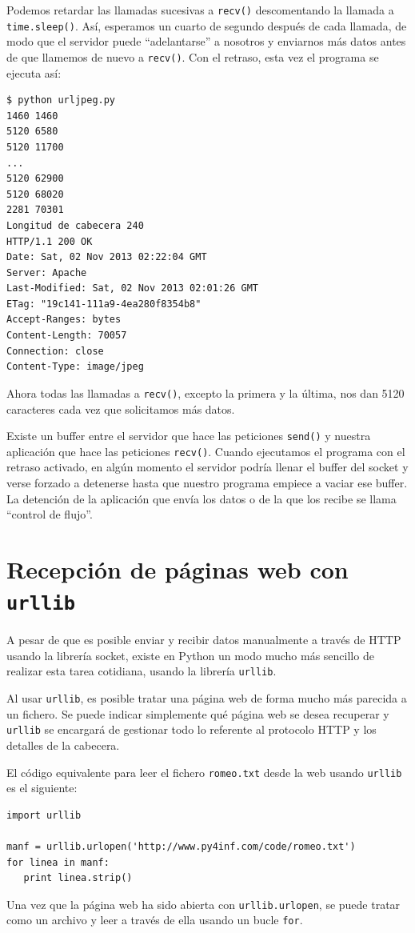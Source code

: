 Podemos retardar las llamadas sucesivas a {\tt recv()} descomentando la llamada
a {\tt time.sleep()}. Así, esperamos un cuarto de segundo después de cada llamada,
de modo que el servidor puede ``adelantarse'' a nosotros y enviarnos más datos
antes de que llamemos de nuevo a {\tt recv()}. Con el retraso, esta vez el programa
se ejecuta así:
\beforeverb
\begin{verbatim}
$ python urljpeg.py 
1460 1460
5120 6580
5120 11700
...
5120 62900
5120 68020
2281 70301
Longitud de cabecera 240
HTTP/1.1 200 OK
Date: Sat, 02 Nov 2013 02:22:04 GMT
Server: Apache
Last-Modified: Sat, 02 Nov 2013 02:01:26 GMT
ETag: "19c141-111a9-4ea280f8354b8"
Accept-Ranges: bytes
Content-Length: 70057
Connection: close
Content-Type: image/jpeg
\end{verbatim}
\afterverb
%
Ahora todas las llamadas a {\tt recv()}, excepto la primera y la última,
nos dan 5120 caracteres cada vez que solicitamos más datos.

Existe un buffer entre el servidor que hace las peticiones {\tt send()}
y nuestra aplicación que hace las peticiones {\tt recv()}. Cuando ejecutamos
el programa con el retraso activado, en algún momento el servidor podría
llenar el buffer del socket y verse forzado a detenerse hasta que
nuestro programa empiece a vaciar ese buffer. La detención de la aplicación
que envía los datos o de la que los recibe se llama
``control de flujo''.

\section{Recepción de páginas web con {\tt urllib}}

A pesar de que es posible enviar y recibir datos manualmente a través de HTTP
usando la librería socket, existe en Python un modo mucho más sencillo de
realizar esta tarea cotidiana,
usando la librería {\tt urllib}.

Al usar {\tt urllib},
es posible tratar una página web de forma mucho más parecida a un fichero. Se puede
indicar simplemente qué página web se desea recuperar y
{\tt urllib} se encargará de gestionar todo lo referente al protocolo HTTP y
los detalles de la cabecera.

El código equivalente para leer el fichero {\tt romeo.txt}
desde la web usando {\tt urllib} es el siguiente:

\beforeverb
\begin{verbatim}
import urllib

manf = urllib.urlopen('http://www.py4inf.com/code/romeo.txt')
for linea in manf:
   print linea.strip()
\end{verbatim}
\afterverb
%
Una vez que la página web ha sido abierta con
{\tt urllib.urlopen}, se puede tratar como
un archivo y leer a través de ella usando un
bucle {\tt for}.

